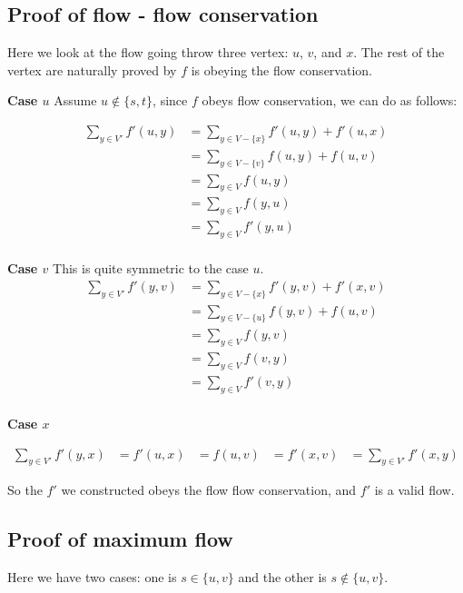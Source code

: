 \documentclass[12pt]{article}
\begin{document}
\subsection{Proof of flow - flow conservation}

Here we look at the flow going throw three vertex: $u$, $v$, and $x$. The rest of the vertex are naturally proved by $f$ is obeying the flow conservation. 

\textbf{Case $u$} Assume $u \notin \{s,t\} $, since $f$ obeys flow conservation, we can do as follows:

\begin{equation}
\begin{aligned}
\sum_{y \in V'} f'(u,y) &= \sum_{y \in V - \{x\}} f'(u,y) + f'(u,x)\\
&= \sum_{y \in V - \{v\}} f(u,y) + f(u,v)\\
&= \sum_{y \in V} f(u,y) \\
&= \sum_{y \in V} f(y,u) \\
&= \sum_{y \in V} f'(y,u) \\
\end{aligned}
\end{equation}

\textbf{Case $v$}
This is quite symmetric to the case $u$.
\begin{equation}
\begin{aligned}
\sum_{y \in V'} f'(y,v) &= \sum_{y \in V - \{x\}} f'(y,v) + f'(x,v)\\
&= \sum_{y \in V - \{u\}} f(y,v) + f(u,v)\\
&= \sum_{y \in V} f(y,v) \\
&= \sum_{y \in V} f(v,y) \\
&= \sum_{y \in V} f'(v,y) \\
\end{aligned}
\end{equation}

\textbf{Case $x$}

\begin{equation}
\begin{aligned}
\sum_{y \in V'} f'(y,x) &= f'(u,x)
&= f(u,v)
&= f'(x,v)
&= \sum_{y \in V'} f'(x,y)
\end{aligned}
\end{equation}


So the $f'$ we constructed obeys the flow flow conservation, and $f'$ is a valid flow.

\subsection{Proof of maximum flow}
Here we have two cases: one is $s \in \{u, v\}$ and the other is $s \notin \{u, v\}$. 
\end{document}
